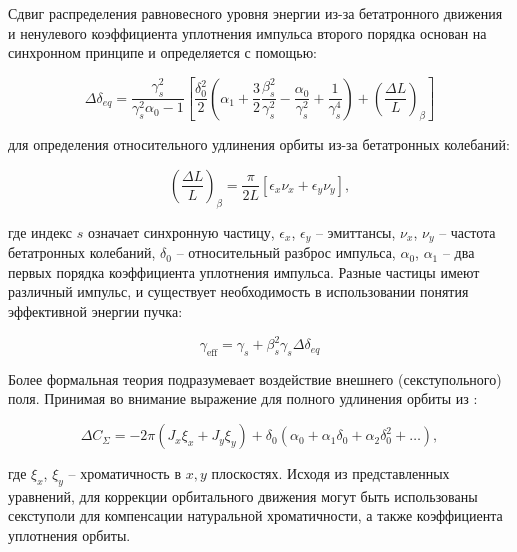 \par Сдвиг распределения равновесного уровня энергии из-за бетатронного движения и ненулевого коэффициента уплотнения импульса второго порядка основан на синхронном принципе \cite{Senichev:2013_decoherence} и определяется с помощью:

\begin{equation}
\Delta\delta_{eq}=\frac{\gamma_s^2}{\gamma_s^2\alpha_0-1}\left[\frac{\delta_0^2}{2}\left(\alpha_1+\frac{3}{2}\frac{\beta_s^2}{\gamma_s^2}-\frac{\alpha_0}{\gamma_s^2}+\frac{1}{\gamma_s^4}\right)+\left(\frac{\Delta L}{L}\right)_\beta\right]
\label{eq:equilibrium}
\end{equation}

\noindent для определения относительного удлинения орбиты из-за бетатронных колебаний:

\begin{equation}
\left(\frac{\Delta L}{L}\right)_\beta=\frac{\pi}{2L}\left[\epsilon_x\nu_x+\epsilon_y\nu_y\right],
\end{equation}

\noindent где индекс $s$ означает синхронную частицу, $\epsilon_x$, $\epsilon_y$ – эмиттансы, $\nu_x$, $\nu_y$ – частота бетатронных колебаний, $\delta_0$ – относительный разброс импульса, $\alpha_0$, $\alpha_1$ – два первых порядка коэффициента уплотнения импульса. Разные частицы имеют различный импульс, и существует необходимость в использовании понятия эффективной энергии пучка:

\begin{equation}
	\gamma_{\text{eff}}=\gamma_s+\beta_s^2\gamma_s\Delta\delta_{eq}
\end{equation}

\par Более формальная теория подразумевает воздействие внешнего (секступольного) поля. Принимая во внимание выражение для полного удлинения орбиты из \cite{orbit_length}:

\begin{equation}
\Delta C_\Sigma=-2\pi\left(J_x\xi_x+J_y\xi_y\right)+\delta_0\left(\alpha_0+\alpha_1\delta_0+\alpha_2\delta_0^2+\ldots\right),
\label{eq:orbit_length}
\end{equation}

\noindent где $\xi_x$, $\xi_y$ – хроматичность в $x, y$ плоскостях. Исходя из представленных уравнений, для коррекции орбитального движения могут быть использованы секступоли для компенсации натуральной хроматичности, а также коэффициента уплотнения орбиты.

